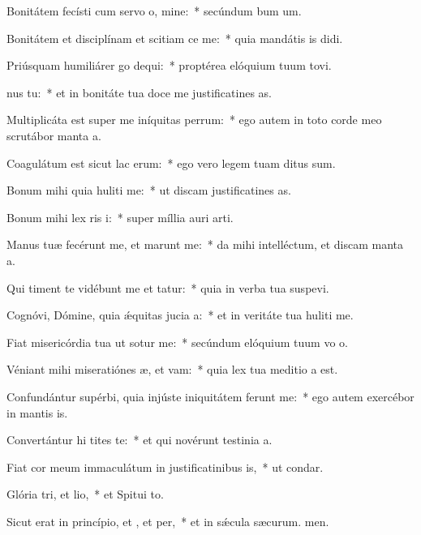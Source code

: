 \item Bonitátem fecísti cum servo o, mine:~* secúndum bum um.
\item Bonitátem et disciplínam et scitiam ce me:~* quia mandátis is didi.
\item Priúsquam humiliárer go dequi:~* proptérea elóquium tuum tovi.
\item {}nus  tu:~* et in bonitáte tua doce me justificatines as.
\item Multiplicáta est super me iníquitas perrum:~* ego autem in toto corde meo scrutábor manta a.
\item Coagulátum est sicut lac  erum:~* ego vero legem tuam ditus sum.
\item Bonum mihi quia huliti me:~* ut discam justificatines as.
\item Bonum mihi lex ris i:~* super míllia auri  arti.
\item Manus tuæ fecérunt me, et marunt me:~* da mihi intelléctum, et discam manta a.
\item Qui timent te vidébunt me et tatur:~* quia in verba tua suspevi.
\item Cognóvi, Dómine, quia ǽquitas jucia a:~* et in veritáte tua huliti me.
\item Fiat misericórdia tua ut sotur me:~* secúndum elóquium tuum vo o.
\item Véniant mihi miseratiónes æ, et vam:~* quia lex tua meditio a est.
\item Confundántur supérbi, quia injúste iniquitátem ferunt  me:~* ego autem exercébor in mantis is.
\item Convertántur hi tites te:~* et qui novérunt testinia a.
\item Fiat cor meum immaculátum in justificatinibus is,~* ut  condar.
\item Glória tri, et lio,~* et Spitui to.
\item Sicut erat in princípio, et , et per,~* et in sǽcula sæcurum. men.
